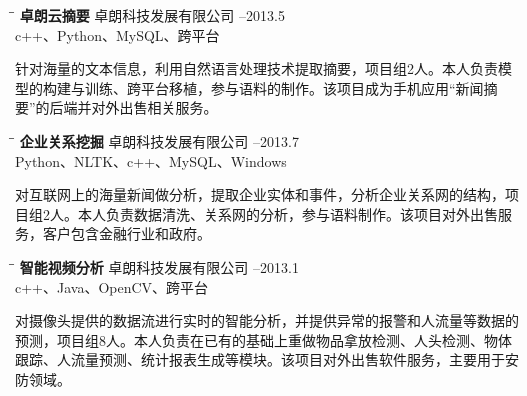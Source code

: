 \documentclass{res}
\begin{document}
\begin{CJK}{UTF8}{gbsn}
\begin{resume}
   \vspace{-0.1in}	
   \begin{tabbing}
   \hspace{2.3in}\= \hspace{2.6in}\= \kill %
    {\bf 卓朗云摘要} \>卓朗科技发展有限公司     --2013.5\\
                             \>c++、Python、MySQL、跨平台
   \end{tabbing}\vspace{-20pt}      %
   针对海量的文本信息，利用自然语言处理技术提取摘要，项目组2人。本人负责模型的构建与训练、跨平台移植，参与语料的制作。该项目成为手机应用“新闻摘要”的后端并对外出售相关服务。
   
   \vspace{-0.1in}	
   \begin{tabbing}
   \hspace{2.3in}\= \hspace{2.6in}\= \kill %
    {\bf 企业关系挖掘} \>卓朗科技发展有限公司     --2013.7\\
                             \>Python、NLTK、c++、MySQL、Windows
   \end{tabbing}\vspace{-20pt}      %
   对互联网上的海量新闻做分析，提取企业实体和事件，分析企业关系网的结构，项目组2人。本人负责数据清洗、关系网的分析，参与语料制作。该项目对外出售服务，客户包含金融行业和政府。
   
   \vspace{-0.1in}	
   \begin{tabbing}
   \hspace{2.3in}\= \hspace{2.6in}\= \kill %
    {\bf 智能视频分析} \>卓朗科技发展有限公司     --2013.1\\
                             \>c++、Java、OpenCV、跨平台
   \end{tabbing}\vspace{-20pt}      %
   对摄像头提供的数据流进行实时的智能分析，并提供异常的报警和人流量等数据的预测，项目组8人。本人负责在已有的基础上重做物品拿放检测、人头检测、物体跟踪、人流量预测、统计报表生成等模块。该项目对外出售软件服务，主要用于安防领域。
   

\end{resume}
\end{CJK}
\end{document}
